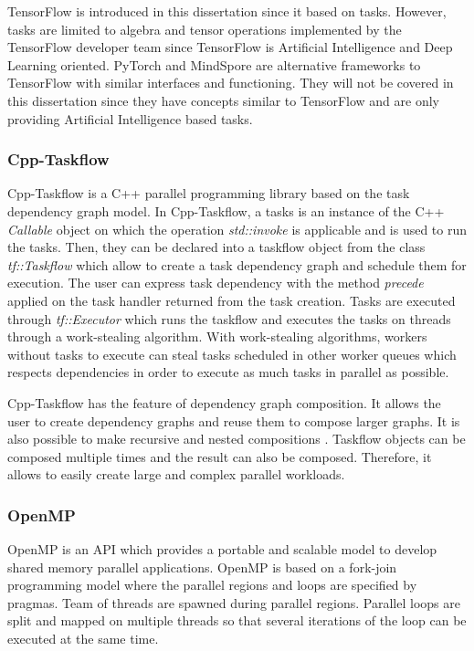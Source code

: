 TensorFlow is introduced in this dissertation since it based on tasks.
However, tasks are limited to algebra and tensor operations implemented by the TensorFlow developer team since TensorFlow is Artificial Intelligence and Deep Learning oriented.
PyTorch \cite{PGMLB2019} and MindSpore are alternative frameworks to TensorFlow with similar interfaces and functioning.
They will not be covered in this dissertation since they have concepts similar to TensorFlow and are only providing Artificial Intelligence based tasks.

\subsubsection{Cpp-Taskflow}
Cpp-Taskflow \cite{LiHGW2019a} \cite{HuLGW2019} is a C++ parallel programming library based on the task dependency graph model.
In Cpp-Taskflow, a tasks is an instance of the C++ \textit{Callable} object on which the operation \textit{std::invoke} is applicable and is used to run the tasks.
Then, they can be declared into a taskflow object from the class \textit{tf::Taskflow} which allow to create a task dependency graph and schedule them for execution.
The user can express task dependency with the method \textit{precede} applied on the task handler returned from the task creation.
Tasks are executed through \textit{tf::Executor} which runs the taskflow and executes the tasks on threads through a work-stealing algorithm.
With work-stealing algorithms, workers without tasks to execute can steal tasks scheduled in other worker queues which respects dependencies in order to execute as much tasks in parallel as possible.

Cpp-Taskflow has the feature of dependency graph composition.
It allows the user to create dependency graphs and reuse them to compose larger graphs.
It is also possible to make recursive and nested compositions \cite{LiHGW2019b}.
Taskflow objects can be composed multiple times and the result can also be composed.
Therefore, it allows to easily create large and complex parallel workloads.

\subsubsection{OpenMP}
OpenMP \cite{DaguM1998} is an API which provides a portable and scalable model to develop shared memory parallel applications.
OpenMP is based on a fork-join programming model where the parallel regions and loops are specified by pragmas.
Team of threads are spawned during parallel regions.
Parallel loops are split and mapped on multiple threads so that several iterations of the loop can be executed at the same time.

